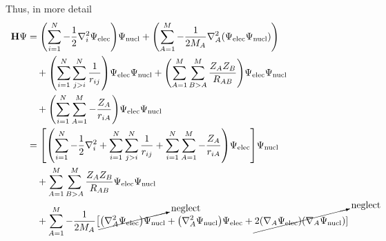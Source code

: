 \documentclass[12pt,a4paper,titlepage]{article}
\newcommand{\trm}[1]{\textrm{#1}} %
\begin{document}
Thus, in more detail
\begin{equation}
\begin{aligned}
\vb{H}\Psi&=\qty(\sum_{i=1}^{N}-\frac{1}{2}\nabla_{i}^{2}\Psi_{\trm{elec}})\Psi_{\trm{nucl}}+\qty(\sum_{A=1}^{M}-\frac{1}{2M_{A}}\nabla_{A}^{2}\qty(\Psi_{\trm{elec}}\Psi_{\trm{nucl}}))\\
&\quad+\qty(\sum_{i=1}^{N}\sum_{j>i}^{N}\frac{1}{r_{ij}})\Psi_{\trm{elec}}\Psi_{\trm{nucl}}+\qty(\sum_{A=1}^{M}\sum_{B>A}^{M}\frac{Z_{A}Z_{B}}{R_{AB}})\Psi_{\trm{elec}}\Psi_{\trm{nucl}}\\
&\quad+\qty(\sum_{i=1}^{N}\sum_{A=1}^{M}-\frac{Z_{A}}{r_{iA}})\Psi_{\trm{elec}}\Psi_{\trm{nucl}}\\
&=\qty[\qty(\sum_{i=1}^{N}-\frac{1}{2}\nabla_{i}^{2}+\sum_{i=1}^{N}\sum_{j>i}^{N}\frac{1}{r_{ij}}+\sum_{i=1}^{N}\sum_{A=1}^{M}-\frac{Z_{A}}{r_{iA}})\Psi_{\trm{elec}}]\Psi_{\trm{nucl}}\\
&\quad+\sum_{A=1}^{M}\sum_{B>A}^{M}\frac{Z_{A}Z_{B}}{R_{AB}}\Psi_{\trm{elec}}\Psi_{\trm{nucl}}\\
&\quad+\sum_{A=1}^{M}-\frac{1}{2M_{A}}\big[\cancelto{\mathrlap{\trm{neglect}}}{\qty(\nabla_{A}^{2}\Psi_{\trm{elec}})\Psi_{\trm{nucl}}}+\qty(\nabla_{A}^{2}\Psi_{\trm{nucl}})\Psi_{\trm{elec}}+\cancelto{\mathrlap{\trm{neglect}}}{2\qty(\nabla_{A}\Psi_{\trm{elec}})\qty(\nabla_{A}\Psi_{\trm{nucl}})}]
\end{aligned}
\end{equation}
\end{document}
